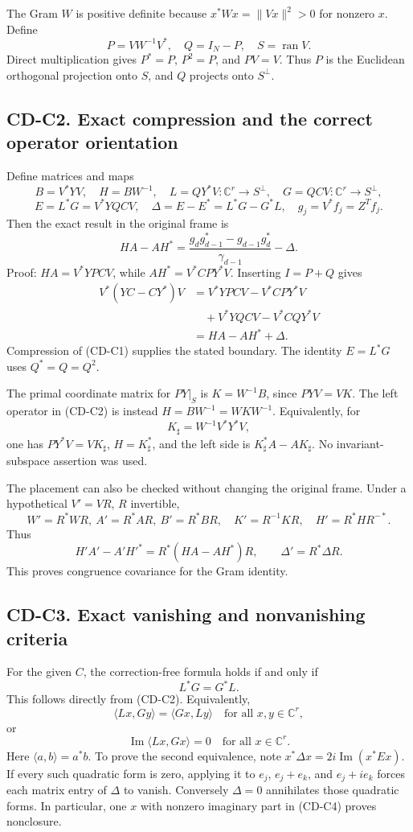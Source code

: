 \documentclass[11pt]{article}
\begin{document}
The Gram \(W\) is positive definite because \(x^*Wx=\|Vx\|^2>0\) for nonzero \(x\). Define \[
P=VW^{-1}V^*,\quad Q=I_N-P,\quad S=\operatorname{ran}V.
\] Direct multiplication gives \(P^*=P\), \(P^2=P\), and \(PV=V\). Thus \(P\) is the Euclidean orthogonal projection onto \(S\), and \(Q\) projects onto \(S^\perp\).

\subsection{CD-C2. Exact compression and the correct operator orientation}\label{cdaudit:cd-c2.-exact-compression-and-the-correct-operator-orientation}

Define matrices and maps \[
B=V^*YV,\quad H=BW^{-1},\quad
L=QY^*V:\mathbb C^r\to S^\perp,\quad
G=QCV:\mathbb C^r\to S^\perp,
\] \[
E=L^*G=V^*YQCV,\quad
\Delta=E-E^*=L^*G-G^*L,\quad g_j=V^*f_j=Z^Tf_j.
\] Then the exact result in the original frame is \[
\boxed{HA-AH^*
=\frac{g_dg_{d-1}^*-g_{d-1}g_d^*}{\gamma_{d-1}}-\Delta.}
\tag{CD-C2}
\] Proof: \(HA=V^*YPCV\), while \(AH^*=V^*CPY^*V\). Inserting \(I=P+Q\) gives \[
\begin{aligned}
V^*(YC-CY^*)V
&=V^*YPCV-V^*CPY^*V\\
&\quad+V^*YQCV-V^*CQY^*V\\
&=HA-AH^*+\Delta.
\end{aligned}
\] Compression of (CD-C1) supplies the stated boundary. The identity \(E=L^*G\) uses \(Q^*=Q=Q^2\).

The primal coordinate matrix for \(PY|_S\) is \(K=W^{-1}B\), since \(PYV=VK\). The left operator in (CD-C2) is instead \(H=BW^{-1}=WKW^{-1}\). Equivalently, for \[
K_\sharp=W^{-1}V^*Y^*V,
\] one has \(PY^*V=VK_\sharp\), \(H=K_\sharp^*\), and the left side is \(K_\sharp^*A-AK_\sharp\). No invariant-subspace assertion was used.

The placement can also be checked without changing the original frame. Under a hypothetical \(V'=VR\), \(R\) invertible, \[
W'=R^*WR,\ A'=R^*AR,\ B'=R^*BR,\quad
K'=R^{-1}KR,\quad H'=R^*HR^{-*}.
\] Thus \[
H'A'-A'H'^*=R^*(HA-AH^*)R,\qquad \Delta'=R^*\Delta R.
\] This proves congruence covariance for the Gram identity.

\subsection{CD-C3. Exact vanishing and nonvanishing criteria}\label{cdaudit:cd-c3.-exact-vanishing-and-nonvanishing-criteria}

For the given \(C\), the correction-free formula holds if and only if \[
\boxed{L^*G=G^*L.}
\tag{CD-C3}
\] This follows directly from (CD-C2). Equivalently, \[
\langle Lx,Gy\rangle=\langle Gx,Ly\rangle
\quad\text{for all }x,y\in\mathbb C^r,
\] or \[
\operatorname{Im}\langle Lx,Gx\rangle=0
\quad\text{for all }x\in\mathbb C^r.
\tag{CD-C4}
\] Here \(\langle a,b\rangle=a^*b\). To prove the second equivalence, note \(x^*\Delta x=2i\operatorname{Im}(x^*Ex)\). If every such quadratic form is zero, applying it to \(e_j\), \(e_j+e_k\), and \(e_j+ie_k\) forces each matrix entry of \(\Delta\) to vanish. Conversely \(\Delta=0\) annihilates those quadratic forms. In particular, one \(x\) with nonzero imaginary part in (CD-C4) proves nonclosure.
\end{document}
